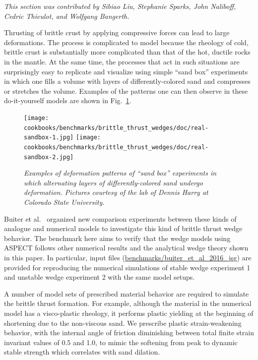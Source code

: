 \documentclass{article}
\newcommand{\aspect}{\textsc{ASPECT}}
\begin{document}
\textit{This section was contributed by Sibiao Liu, Stephanie Sparks, John
Naliboff, Cedric Thieulot, and Wolfgang Bangerth.}

Thrusting of brittle crust by applying compressive forces can lead to
large deformations. The process is complicated to model because the
rheology of cold, brittle crust is substantially more complicated than
that of the hot, ductile rocks in the mantle. At the same time, the
processes that act in such situations are surprisingly easy to
replicate and visualize using simple ``sand box'' experiments in which
one fills a volume with layers of differently-colored sand and compresses
or stretches the volume. Examples of the patterns one can then observe
in these do-it-yourself models are shown in
Fig.~\ref{fig:sandbox-images}.

\begin{figure}
  \centering
  \texttt{[image: cookbooks/benchmarks/brittle\_thrust\_wedges/doc/real-sandbox-1.jpg]}
  \hfill
  \texttt{[image: cookbooks/benchmarks/brittle\_thrust\_wedges/doc/real-sandbox-2.jpg]}
  \caption{\it Examples of deformation patterns of ``sand box'' experiments in
    which alternating layers of differently-colored sand undergo deformation.
    Pictures courtesy of the lab of Dennis Harry at Colorado State University.}
  \label{fig:sandbox-images}
\end{figure}

Buiter et al.~\cite{buiter16} organized new comparison experiments between these kinds of
analogue and numerical models to investigate this kind of brittle thrust wedge behavior. The
benchmark here aims to verify that the wedge models using \aspect{} follows other
numerical results and the analytical wedge theory shown in this paper. In particular,
input files (\url{benchmarks/buiter_et_al_2016_jsg}) are provided for reproducing
the numerical simulations of stable wedge experiment 1 and unstable wedge experiment
2 with the same model setups.

A number of model sets of prescribed material behavior are required to simulate
the brittle thrust formation. For example, although the material in the numerical
model has a visco-plastic rheology, it performs plastic yielding at the beginning
of shortening due to the non-viscous sand. We prescribe plastic strain-weakening
behavior, with the internal angle of friction diminishing between total finite
strain invariant values of 0.5 and 1.0, to mimic the softening from peak to
dynamic stable strength which correlates with sand dilation.
\end{document}
